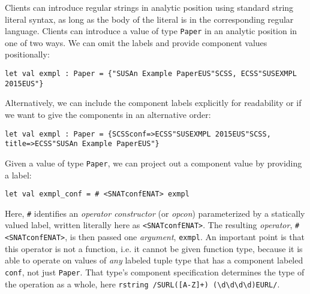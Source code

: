 
Clients can introduce regular strings in analytic position using standard string literal syntax, as long as the body of the literal is in the corresponding regular language. 
Clients can introduce a value of type \lstinline{Paper} in an analytic position in one of two ways. We can omit the labels and provide component values positionally:
\begin{lstlisting}[numbers=none]
let val exmpl : Paper = {"SUSAn Example PaperEUS"SCSS, ECSS"SUSEXMPL 2015EUS"}
\end{lstlisting}
Alternatively, we can include the component labels explicitly for readability or if we want to give the components in an alternative order:
\begin{lstlisting}[numbers=none]
let val exmpl : Paper = {SCSSconf=>ECSS"SUSEXMPL 2015EUS"SCSS, title=>ECSS"SUSAn Example PaperEUS"}
\end{lstlisting}

Given a value of type \lstinline{Paper}, we can project out a component value by providing  a  label:%
\begin{lstlisting}[numbers=none]
let val exmpl_conf = # <SNATconfENAT> exmpl 
\end{lstlisting}
Here, \lstinline{#} identifies an \emph{operator constructor} (or \emph{opcon}) parameterized by a statically valued label, written literally here as \lstinline{<SNATconfENAT>}. The resulting \emph{operator}, \lstinline{# <SNATconfENAT>}, is then passed one \emph{argument}, \lstinline{exmpl}. An important point is that this operator is not a function, i.e. it cannot be given function type, because it is able to operate on values of \emph{any} labeled tuple type that has a component labeled \lstinline{conf}, not just \lstinline{Paper}. That type's component specification determines the type of the operation as a whole, here \lstinline{rstring /SURL([A-Z]+) (\d\d\d\d)EURL/}.

